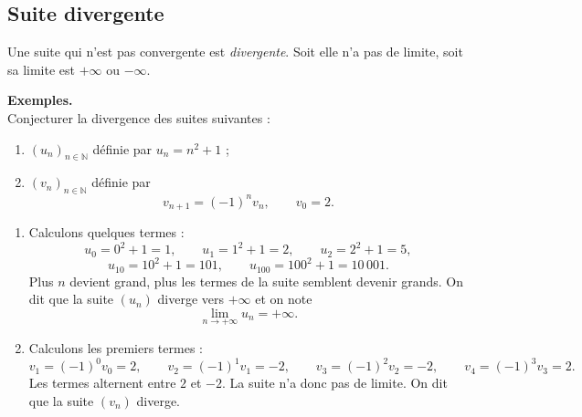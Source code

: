 \documentclass[11pt]{article}
\newcommand{\NN}{\mathbb{N}}
\newenvironment{exemples}{\par\smallskip\noindent\textbf{Exemples. \\}\ignorespaces}{\par\smallskip}
\begin{document}
\subsection{Suite divergente}

\begin{definition}
Une suite qui n'est pas convergente est \emph{divergente}. Soit elle n'a pas de limite, soit sa limite est $+\infty$ ou $-\infty$.
\end{definition}

\begin{exemples}
Conjecturer la divergence des suites suivantes :
\begin{enumerate}[label=\arabic*.]
    \item $(u_n)_{n\in\NN}$ définie par $u_n=n^2+1$ ;
    \item $(v_n)_{n\in\NN}$ définie par
    \[
    v_{n+1}=(-1)^n v_n,\qquad v_0=2.
    \]
\end{enumerate}

\begin{enumerate}[label=\arabic*.]
    \item Calculons quelques termes :
    \[
    u_0=0^2+1=1,\qquad
    u_1=1^2+1=2,\qquad
    u_2=2^2+1=5,
    \]
    \[
    u_{10}=10^2+1=101,\qquad
    u_{100}=100^2+1=10\,001.
    \]
    Plus $n$ devient grand, plus les termes de la suite semblent devenir grands. On dit que la suite $(u_n)$ diverge vers $+\infty$ et on note
    \[
    \lim_{n\to+\infty}u_n=+\infty.
    \]

    \item Calculons les premiers termes :
    \[
    v_1=(-1)^0v_0=2,\qquad
    v_2=(-1)^1v_1=-2,\qquad
    v_3=(-1)^2v_2=-2,\qquad
    v_4=(-1)^3v_3=2.
    \]
    Les termes alternent entre $2$ et $-2$. La suite n'a donc pas de limite. On dit que la suite $(v_n)$ diverge.
\end{enumerate}
\end{exemples}
\end{document}
